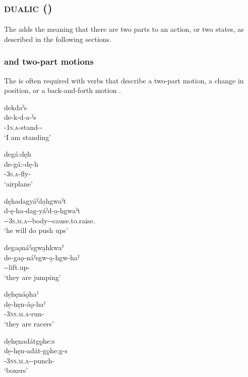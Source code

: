 \subsection{ \textsc{dualic} ({\dualic})} \label{[de-] (dualic)}
The  {\dualic} adds the meaning that there are two parts to an action, or two states, as described in the following sections.

\subsubsection*{ {\dualic} and two-part motions} \label{[de-] (dualic) and two-part motions}
The  {\dualic} is often required with verbs that describe a two-part motion, a change in position, or a back-and-forth motion .


\ea\label{ex:detwoex}

\ea dekdaˀs\\
\gll de-k-d-a-ˀs\\
{\dualic}-\textsc{1s.a}-stand--{\habitual}\\
\glt `I am standing'

\ex degá:dęh\\
\gll de-gá:-dę-h\\
{\dualic}-\textsc{3s.a}-fly-{\habitual}\\
\glt `airplane'

\ex dęhadagyáˀda̱hgwaˀt\\
\gll d-ę-ha-dag-yáˀd-a̱-hgwaˀt\\
{\dualic}-{\future}-\textsc{3s.m.a}-{}-body-{\joinerA}-cause.to.\-raise.{\zeropunctual}\\
\glt `he will do push ups'

\ex degaǫnáˀsgwa̱hkwaˀ\\
\gll de-gaǫ-náˀsgw-a̱-hgw-haˀ\\
{\dual}--lift.up-{\habitual}\\
\glt `they are jumping'

\ex de̱hęnáǫhaˀ\\
\gll de̱-hęn-áǫ-haˀ\\
{\dualic}-\textsc{3ns.m.a}-run-{\habitual}\\
\glt `they are racers'

\ex de̱hęnadátgǫ̱he:s\\
\gll de̱-hęn-adát-gǫ̱he:g-s\\
{\dualic}-\textsc{3ns.m.a}-{}-punch-{\habitual}\\
\glt `boxers'


